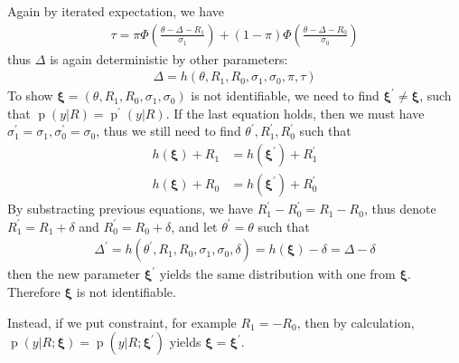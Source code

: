 \documentclass[12pt]{article}
\DeclareMathOperator{\pr}{p}
\begin{document}
Again by iterated expectation, we have
\begin{align*}
  \tau = \pi \Phi \left( \frac{\theta - \Delta - R_1}{\sigma_1} \right) + (1 - \pi) \Phi \left(
    \frac{\theta - \Delta - R_0}{\sigma_0} \right)
\end{align*}
thus $\Delta$ is again deterministic by other parameters:
\begin{align*}
  \Delta = h(\theta, R_1, R_0, \sigma_1, \sigma_0 , \pi, \tau)
\end{align*}
To show $\bm \xi = (\theta, R_1, R_0, \sigma_1, \sigma_0)$ is not identifiable, we need
to find $\bm \xi^{'} \neq \bm \xi$, such that $\pr(y|R) =
\pr^{'}(y|R)$. If the last equation holds, then we must have
$\sigma_1^{'} = \sigma_1, \sigma_0^{'} = \sigma_0$, thus we still need
to find $\theta^{'} , R_1^{'}, R_0^{'}$ such that
\begin{align*}
  h(\bm \xi) + R_1 & = h(\bm \xi^{'}) + R_1^{'} \\
  h(\bm \xi) + R_0 & = h(\bm \xi^{'}) + R_0^{'}
\end{align*}
By substracting previous equations, we have $R_1^{'}- R_0^{'} = R_1-
R_0$, thus denote $R_1^{'} = R_1 + \delta$ and $R_0^{'} = R_0 +
\delta$, and let $\theta^{'} = \theta$ such that
\begin{align*}
  \Delta^{'} = h(\theta^{'}, R_1, R_0, \sigma_1, \sigma_0, \delta) = h(\bm \xi) - \delta = \Delta - \delta
\end{align*}
then the new parameter $\bm \xi^{'}$ yields the same distribution with
one from $\bm \xi$. Therefore $\bm \xi$ is not identifiable.

Instead, if we put constraint, for example $R_1 = -R_0$, then by
calculation, $\pr(y|R;\bm \xi) = \pr(y|R; \bm \xi^{'})$ yields $\bm \xi =
\bm \xi^{'}$.
\end{document}
